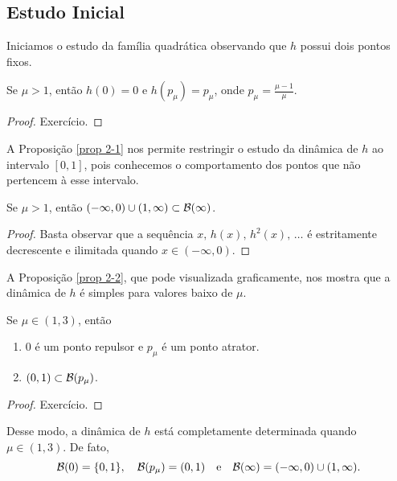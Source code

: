 \subsection{Estudo Inicial}

Iniciamos o estudo da família quadrática observando que $h$ possui dois pontos fixos.

\begin{proposition}
Se $\mu > 1$, então $h(0) = 0$ e $h(p_\mu) = p_\mu$, onde $p_\mu = \frac{\mu-1}{\mu}$.
\end{proposition}

\begin{proof}
Exercício.
\end{proof}

A Proposição \ref{prop 2-1} nos permite restringir o estudo da dinâmica de $h$ ao intervalo $[0, 1]$, pois conhecemos o comportamento dos pontos que não pertencem à esse intervalo.

\begin{proposition}\label{prop 2-1}
Se $\mu > 1$, então $(-\infty, 0) \cup (1, \infty) \subset \mathcal{B}(\infty)$.
\end{proposition}

\begin{proof}
Basta observar que a sequência $x, \, h(x), \, h^2(x), \, \dots$ é estritamente decrescente e ilimitada quando $x \in (-\infty, 0)$.
\end{proof}

A Proposição \ref{prop 2-2}, que pode visualizada graficamente, nos mostra que a dinâmica de $h$ é simples para valores baixo de $\mu$.

\begin{proposition}\label{prop 2-2}
Se $\mu \in (1, 3)$, então
\begin{enumerate}
\item $0$ é um ponto repulsor e $p_\mu$ é um ponto atrator.
\item $(0, 1) \subset \mathcal{B}(p_\mu)$.
\end{enumerate}
\end{proposition}

\begin{proof}
Exercício.
\end{proof}

Desse modo, a dinâmica de $h$ está completamente determinada quando $\mu \in (1, 3)$. De fato,
$$\mathcal{B}(0) = \lbrace 0, 1 \rbrace, \quad \mathcal{B}(p_\mu) = (0, 1) \quad \text{e}  \quad \mathcal{B}(\infty) = (-\infty, 0) \cup (1, \infty).$$
